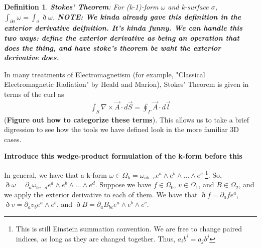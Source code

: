\documentclass{book}
\newtheorem{defn}[equation]{Definition}
\begin{document}
 
 
 
 
 
 






\begin{defn}
	\textbf{Stokes' Theorem}: For (k-1)-form $\omega$ and k-surface $\sigma$, $\int_{\partial \sigma}\omega = \int_{\sigma}\eth\omega$. \textbf{NOTE: We kinda already gave this definition in the exterior derivative deifnition. It's kinda funny. We can handle this two ways: define the exterior derivative as being an operation that does the thing, and have stoke's theorem be waht the exterior derivative does. }
\end{defn}

In many treatments of Electromagnetism (for example, "Classical Electromagnetic Radiation" by Heald and Marion), Stokes' Theorem is given in terms of the curl as \begin{gather}\int_S \nabla \times \vec{A} \cdot d\vec{S} = \oint_{\Gamma} \vec{A} \cdot d\vec{l}\end{gather} (\textbf{Figure out how to categorize these terms}). This allows us to take a brief digression to see how the tools we have defined look in the more familiar 3D cases. 

\textbf{Introduce this wedge-product formulation of the k-form before this}

In general, we have that a k-form $\omega \in \Omega_k = \omega_{ab...c}e^a\wedge e^b \wedge ... \wedge e^c$ \footnote{This is still Einstein summation convention. We are free to change paired indices, as long as they are changed together. Thus, $a_i b^i = a_j b^j$}. So, $\eth \omega = \partial_a \omega_{bc...d}e^a \wedge e^b \wedge ... \wedge e^d$. Suppose we have $f \in \Omega_0$, $v \in \Omega_1$, and $B \in \Omega_2$, and we apply the exterior derivative to each of them. We have that $\eth f = \partial_a f e^a$, $\eth v = \partial_a v_b e^a \wedge e^b$, and $\eth B = \partial_a B_{bc} e^a\wedge e^b \wedge e^c$. 
\end{document}
